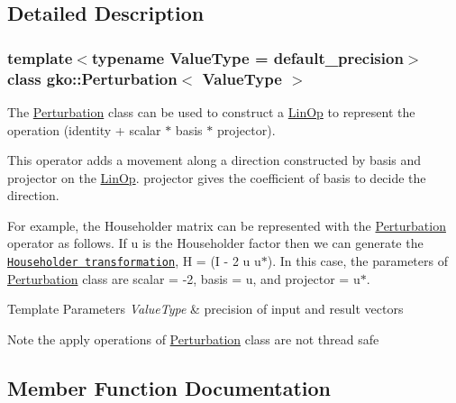 \subsection{Detailed Description}
\subsubsection*{template$<$typename Value\+Type = default\+\_\+precision$>$\newline
class gko\+::\+Perturbation$<$ Value\+Type $>$}

The \hyperlink{classgko_1_1Perturbation}{Perturbation} class can be used to construct a \hyperlink{classgko_1_1LinOp}{Lin\+Op} to represent the operation {\ttfamily (identity + scalar $\ast$ basis $\ast$ projector)}. 

This operator adds a movement along a direction constructed by {\ttfamily basis} and {\ttfamily projector} on the \hyperlink{classgko_1_1LinOp}{Lin\+Op}. {\ttfamily projector} gives the coefficient of {\ttfamily basis} to decide the direction.

For example, the Householder matrix can be represented with the \hyperlink{classgko_1_1Perturbation}{Perturbation} operator as follows. If u is the Householder factor then we can generate the \href{https://en.wikipedia.org/wiki/Householder_transformation}{\tt Householder transformation}, H = (I -\/ 2 u u$\ast$). In this case, the parameters of \hyperlink{classgko_1_1Perturbation}{Perturbation} class are scalar = -\/2, basis = u, and projector = u$\ast$.


\begin{DoxyTemplParams}{Template Parameters}
{\em Value\+Type} & precision of input and result vectors\\
\hline
\end{DoxyTemplParams}
\begin{DoxyNote}{Note}
the apply operations of \hyperlink{classgko_1_1Perturbation}{Perturbation} class are not thread safe 
\end{DoxyNote}


\subsection{Member Function Documentation}
\mbox{\label{classgko_1_1Perturbation_a4080d4c1ea5529e5eb51eea5f85946bb}} 
